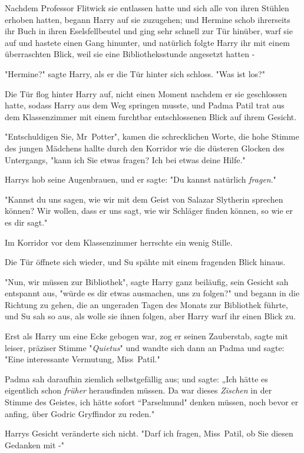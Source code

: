 {Nachdem Professor Flitwick sie entlassen hatte und sich alle von ihren Stühlen erhoben hatten, begann Harry auf sie zuzugehen; und Hermine schob ihrerseits ihr Buch in ihren Eselsfellbeutel und ging sehr schnell zur Tür hinüber, warf sie auf und hastete einen Gang hinunter, und natürlich folgte Harry ihr mit einem überraschten Blick, weil sie eine Bibliotheksstunde angesetzt hatten -

"Hermine?" sagte Harry, als er die Tür hinter sich schloss. "Was ist los?"

Die Tür flog hinter Harry auf, nicht einen Moment nachdem er sie geschlossen hatte, sodass Harry aus dem Weg springen musste, und Padma Patil trat aus dem Klassenzimmer mit einem furchtbar entschlossenen Blick auf ihrem Gesicht.

"Entschuldigen Sie, Mr~Potter", kamen die schrecklichen Worte, die hohe Stimme des jungen Mädchens hallte durch den Korridor wie die düsteren Glocken des Untergangs, "kann ich Sie etwas fragen? Ich bei etwas deine Hilfe."

Harrys hob seine Augenbrauen, und er sagte: "Du kannst natürlich \emph{fragen}."

"Kannst du uns sagen, wie wir mit dem Geist von Salazar Slytherin sprechen können? Wir wollen, dass er uns sagt, wie wir Schläger finden können, so wie er es dir sagt."

Im Korridor vor dem Klassenzimmer herrschte ein wenig Stille.

Die Tür öffnete sich wieder, und Su spähte mit einem fragenden Blick hinaus.

"Nun, wir müssen zur Bibliothek", sagte Harry ganz beiläufig, sein Gesicht sah entspannt aus, "würde es dir etwas ausmachen, uns zu folgen?" und begann in die Richtung zu gehen, die an ungeraden Tagen des Monats zur Bibliothek führte, und Su sah so aus, als wolle sie ihnen folgen, aber Harry warf ihr einen Blick zu.

Erst als Harry um eine Ecke gebogen war, zog er seinen Zauberstab, sagte mit leiser, präziser Stimme "\emph{Quietus}" und wandte sich dann an Padma und sagte: "Eine interessante Vermutung, Miss~Patil."

Padma sah daraufhin ziemlich selbstgefällig aus; und sagte: „Ich hätte es eigentlich schon \emph{früher} herausfinden müssen. Da war dieses \emph{Zischen} in der Stimme des Geistes, ich hätte sofort “Parselmund" denken müssen, noch bevor er anfing, über Godric Gryffindor zu reden."

Harrys Gesicht veränderte sich nicht. "Darf ich fragen, Miss~Patil, ob Sie diesen Gedanken mit -"

}
